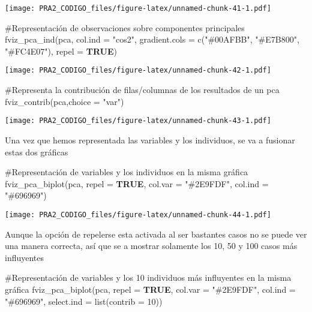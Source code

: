\documentclass[
]{article}
\newenvironment{Shaded}{\begin{snugshade}}{\end{snugshade}}
\newcommand{\AttributeTok}[1]{\textcolor[rgb]{0.80,0.80,0.80}{#1}}
\newcommand{\CommentTok}[1]{\textcolor[rgb]{0.50,0.62,0.50}{#1}}
\newcommand{\ConstantTok}[1]{\textcolor[rgb]{0.86,0.64,0.64}{\textbf{#1}}}
\newcommand{\DecValTok}[1]{\textcolor[rgb]{0.86,0.86,0.80}{#1}}
\newcommand{\FunctionTok}[1]{\textcolor[rgb]{0.94,0.94,0.56}{#1}}
\newcommand{\NormalTok}[1]{\textcolor[rgb]{0.80,0.80,0.80}{#1}}
\newcommand{\StringTok}[1]{\textcolor[rgb]{0.80,0.58,0.58}{#1}}
\begin{document}
\texttt{[image: PRA2\_CODIGO\_files/figure-latex/unnamed-chunk-41-1.pdf]}

\begin{Shaded}
\begin{Highlighting}[]
\CommentTok{\#Representación de observaciones sobre componentes principales}
\FunctionTok{fviz\_pca\_ind}\NormalTok{(pca, }\AttributeTok{col.ind =} \StringTok{"cos2"}\NormalTok{, }\AttributeTok{gradient.cols =} \FunctionTok{c}\NormalTok{(}\StringTok{"\#00AFBB"}\NormalTok{, }\StringTok{"\#E7B800"}\NormalTok{, }\StringTok{"\#FC4E07"}\NormalTok{), }\AttributeTok{repel =} \ConstantTok{TRUE}\NormalTok{)}
\end{Highlighting}
\end{Shaded}

\texttt{[image: PRA2\_CODIGO\_files/figure-latex/unnamed-chunk-42-1.pdf]}

\begin{Shaded}
\begin{Highlighting}[]
\CommentTok{\#Representa la contribución de filas/columnas de los resultados de un pca}
\FunctionTok{fviz\_contrib}\NormalTok{(pca,}\AttributeTok{choice =} \StringTok{"var"}\NormalTok{) }
\end{Highlighting}
\end{Shaded}

\texttt{[image: PRA2\_CODIGO\_files/figure-latex/unnamed-chunk-43-1.pdf]}

Una vez que hemos representada las variables y los individuos, se va a
fusionar estas dos gráficas

\begin{Shaded}
\begin{Highlighting}[]
\CommentTok{\#Representación de variables y los individuos en la misma gráfica}
\FunctionTok{fviz\_pca\_biplot}\NormalTok{(pca, }\AttributeTok{repel =} \ConstantTok{TRUE}\NormalTok{, }\AttributeTok{col.var =} \StringTok{"\#2E9FDF"}\NormalTok{, }\AttributeTok{col.ind =} \StringTok{"\#696969"}\NormalTok{)}
\end{Highlighting}
\end{Shaded}

\texttt{[image: PRA2\_CODIGO\_files/figure-latex/unnamed-chunk-44-1.pdf]}

Aunque la opción de repelerse esta activada al ser bastantes casos no se
puede ver una manera correcta, así que se a mostrar solamente los 10, 50
y 100 casos más influyentes

\begin{Shaded}
\begin{Highlighting}[]
\CommentTok{\#Representación de variables y los 10 individuos más influyentes en la misma gráfica}
\FunctionTok{fviz\_pca\_biplot}\NormalTok{(pca, }\AttributeTok{repel =} \ConstantTok{TRUE}\NormalTok{, }\AttributeTok{col.var =} \StringTok{"\#2E9FDF"}\NormalTok{,}
                \AttributeTok{col.ind =} \StringTok{"\#696969"}\NormalTok{, }\AttributeTok{select.ind =} \FunctionTok{list}\NormalTok{(}\AttributeTok{contrib =} \DecValTok{10}\NormalTok{))}
\end{Highlighting}
\end{Shaded}
\end{document}
